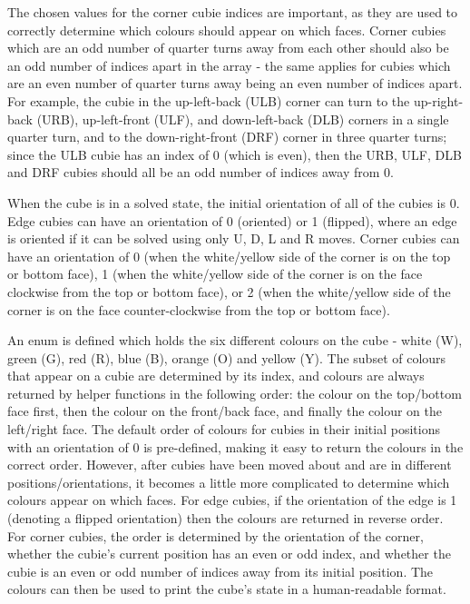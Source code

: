 The chosen values for the corner cubie indices are important, as they are used to correctly determine which colours should appear on which faces. Corner cubies which are an odd number of quarter turns away from each other should also be an odd number of indices apart in the array - the same applies for cubies which are an even number of quarter turns away being an even number of indices apart. For example, the cubie in the up-left-back (ULB) corner can turn to the up-right-back (URB), up-left-front (ULF), and down-left-back (DLB) corners in a single quarter turn, and to the down-right-front (DRF) corner in three quarter turns; since the ULB cubie has an index of 0 (which is even), then the URB, ULF, DLB and DRF cubies should all be an odd number of indices away from 0.

When the cube is in a solved state, the initial orientation of all of the cubies is 0. Edge cubies can have an orientation of 0 (oriented) or 1 (flipped), where an edge is oriented if it can be solved using only U, D, L and R moves. Corner cubies can have an orientation of 0 (when the white/yellow side of the corner is on the top or bottom face), 1 (when the white/yellow side of the corner is on the face clockwise from the top or bottom face), or 2 (when the white/yellow side of the corner is on the face counter-clockwise from the top or bottom face).

An enum is defined which holds the six different colours on the cube - white (W), green (G), red (R), blue (B), orange (O) and yellow (Y). The subset of colours that appear on a cubie are determined by its index, and colours are always returned by helper functions in the following order: the colour on the top/bottom face first, then the colour on the front/back face, and finally the colour on the left/right face. The default order of colours for cubies in their initial positions with an orientation of 0 is pre-defined, making it easy to return the colours in the correct order. However, after cubies have been moved about and are in different positions/orientations, it becomes a little more complicated to determine which colours appear on which faces. For edge cubies, if the orientation of the edge is 1 (denoting a flipped orientation) then the colours are returned in reverse order. For corner cubies, the order is determined by the orientation of the corner, whether the cubie's current position has an even or odd index, and whether the cubie is an even or odd number of indices away from its initial position. The colours can then be used to print the cube's state in a human-readable format.

